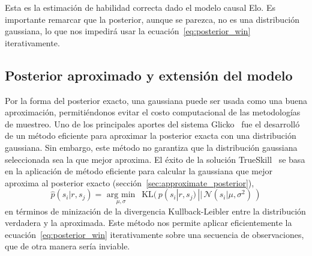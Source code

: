 \documentclass[a4paper,11pt]{book}
\newcommand{\N}{\mathcal{N}}
\theoremstyle{definition}
\begin{document}

Esta es la estimaci\'on de habilidad correcta dado el modelo causal Elo.
%
Es importante remarcar que la posterior, aunque se parezca, no es una distribuci\'on gaussiana, lo que nos impedir\'a usar la ecuaci\'on~\eqref{eq:posterior_win} iterativamente.


\subsection{Posterior aproximado y extensi\'on del modelo}

Por la forma del posterior exacto, una gaussiana puede ser usada como una buena aproximaci\'on, permiti\'endonos evitar el costo computacional de las metodolog\'ias de muestreo.
%
Uno de los principales aportes del sistema Glicko~\cite{Glikman2013} fue el desarroll\'o de un m\'etodo eficiente para aproximar la posterior exacta con una distribuci\'on gaussiana.
%
Sin embargo, este m\'etodo no garantiza que la distribuci\'on gaussiana seleccionada sea la que mejor aproxima.
%
El \'exito de la soluci\'on TrueSkill~\cite{Herbrich2007} se basa en la aplicaci\'on de m\'etodo eficiente para calcular la gaussiana que mejor aproxima al posterior exacto (secci\'on~\ref{sec:approximate_posterior}),
%
\begin{equation} \label{eq:approx}
 \widehat{p}(s_i| r, s_j) = \underset{\mu, \sigma}{\text{ arg min }} \ \ \text{KL}(\, p(s_i| r, s_j) \, || \,  \N(s_i|\mu, \sigma^2) \, )
\end{equation}
%
en t\'erminos de minizaci\'on de la divergencia Kullback-Leibler entre la distribuci\'on verdadera y la aproximada.
%
Este m\'etodo nos permite aplicar eficientemente la ecuaci\'on~\eqref{eq:posterior_win} iterativamente sobre una secuencia de observaciones, que de otra manera ser\'ia inviable.

\end{document}
